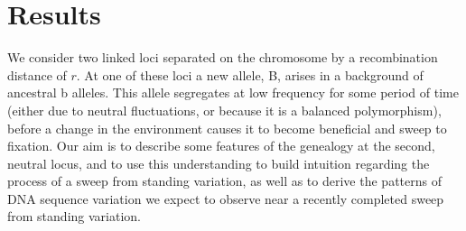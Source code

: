 \documentclass[a4paper,10pt]{article}
\newcommand{\gc}[1]{{\it \color{red} (#1)} }
\newcommand{\jb}[1]{{\it\color{blue} (#1)} }
\begin{document}
%
%
%
%
%
\section{Results}


We consider two linked loci separated on the chromosome by a recombination distance of $r$. At one of these loci a new allele, B, arises in a background of ancestral b alleles. This allele segregates at low frequency for some period of time (either due to neutral fluctuations, or because it is a balanced polymorphism), before a change in the environment causes it to become beneficial and sweep to fixation. Our aim is to describe some features of the genealogy at the second, neutral locus, and to use this understanding to build intuition regarding the process of a sweep from standing variation, as well as to derive the patterns of DNA sequence variation we expect to observe near a recently completed sweep from standing variation.
\end{document}
